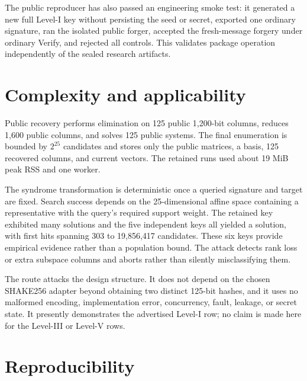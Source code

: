 \documentclass[10pt,a4paper]{article}
\begin{document}
The public reproducer has also passed an engineering smoke test:
it generated a new full Level-I key without persisting the seed or secret,
exported one ordinary signature, ran the isolated public forger, accepted the
fresh-message forgery under ordinary Verify, and rejected all controls. This
validates package operation independently of the sealed research artifacts.

\section{Complexity and applicability}

Public recovery performs elimination on 125 public 1,200-bit columns, reduces
1,600 public columns, and solves 125 public systems. The final enumeration is
bounded by $2^{25}$ candidates and stores only the public matrices, a basis,
125 recovered columns, and current vectors. The retained runs used about
19 MiB peak RSS and one worker.

The syndrome transformation is deterministic once a queried signature and
target are fixed. Search success depends on the 25-dimensional affine space
containing a representative with the query's required support weight. The
retained key exhibited many solutions and the five independent keys all
yielded a solution, with first hits spanning 303 to 19,856,417 candidates.
These six keys provide empirical evidence rather than a population bound. The
attack detects rank loss or extra subspace columns and aborts rather than
silently misclassifying them.

The route attacks the design structure. It does not depend on the chosen
SHAKE256 adapter beyond obtaining two distinct 125-bit hashes, and it uses no
malformed encoding, implementation error, concurrency, fault, leakage, or
secret state. It presently demonstrates the advertised Level-I row; no claim
is made here for the Level-III or Level-V rows.

\section{Reproducibility}
\end{document}
